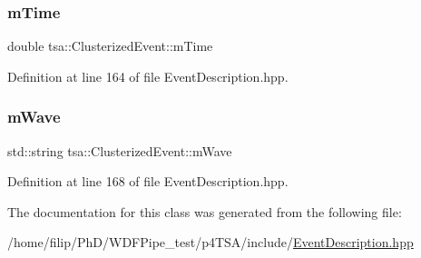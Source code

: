 \mbox{\label{classtsa_1_1_clusterized_event_ad2a8ebd1696cd9d050acfedb57cf194c}} 
\subsubsection{\texorpdfstring{m\+Time}{mTime}}
{\footnotesize\ttfamily double tsa\+::\+Clusterized\+Event\+::m\+Time}



Definition at line 164 of file Event\+Description.\+hpp.

\mbox{\label{classtsa_1_1_clusterized_event_aa919cc07d7538dc4c90e6bbd2efd7674}} 
\subsubsection{\texorpdfstring{m\+Wave}{mWave}}
{\footnotesize\ttfamily std\+::string tsa\+::\+Clusterized\+Event\+::m\+Wave}



Definition at line 168 of file Event\+Description.\+hpp.



The documentation for this class was generated from the following file\+:\begin{DoxyCompactItemize}
\item 
/home/filip/\+Ph\+D/\+W\+D\+F\+Pipe\+\_\+test/p4\+T\+S\+A/include/\hyperlink{_event_description_8hpp}{Event\+Description.\+hpp}\end{DoxyCompactItemize}
